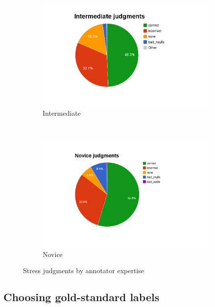 \begin{figure}[htb]
				\begin{subfigure}[b]{.5\textwidth}
					\centering
					\includegraphics[width=\textwidth]{img/annotation/intermediatePie}
					\caption{Intermediate}
					\label{fig:expertisepies:intermediate}
				\end{subfigure}%
				~
				\begin{subfigure}[b]{.5\textwidth}
					\centering
					\includegraphics[width=\textwidth]{img/annotation/novicePie}
					\caption{Novice}
					\label{fig:expertisepies:novice}
				\end{subfigure}%
				\caption{Stress judgments by annotator expertise}
				\label{fig:expertisepies}
			\end{figure}
			
			
			
		\subsection{Choosing gold-standard labels}
		\label{sec:agreement:gold}
		
